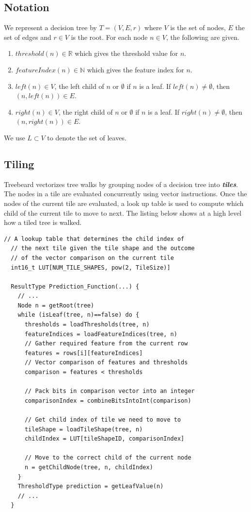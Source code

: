 \subsection{Notation}
We represent a decision tree by $T = (V, E, r)$ where $V$ is the set of nodes, $E$ the set of edges and
$r \in V$ is the root. For each node $n \in V$, the following are given.
\begin{enumerate}
    \item $threshold(n) \in \mathbb{R}$ which gives the threshold value for $n$.
    \item $featureIndex(n) \in \mathbb{N}$ which gives the feature index for $n$.
    \item $left(n) \in V$, the left child of $n$ or $\emptyset$ if $n$ is a leaf. If $left(n) \neq \emptyset$, then $(n, left(n)) \in E$.
    \item $right(n) \in V$, the right child of $n$ or $\emptyset$ if $n$ is a leaf. If $right(n) \neq \emptyset$, then $(n, right(n)) \in E$.
\end{enumerate}
We use $L \subset V$ to denote the set of leaves. 

\subsection{Tiling}
\label{sec:Tiling}
Treebeard vectorizes tree walks by grouping nodes of a decision tree into \textbf{\emph{tiles}}. The nodes in a tile are evaluated concurrently using vector instructions. Once the nodes of the current tile are evaluated, a look up table is used to compute which child of the current tile to move to next. The listing below shows at a high level how a tiled tree is walked. 
\begin{lstlisting}[style=c++]
  // A lookup table that determines the child index of
  // the next tile given the tile shape and the outcome
  // of the vector comparison on the current tile
  int16_t LUT[NUM_TILE_SHAPES, pow(2, TileSize)]
  
  ResultType Prediction_Function(...) {
    // ...
    Node n = getRoot(tree)
    while (isLeaf(tree, n)==false) do {
      thresholds = loadThresholds(tree, n)
      featureIndices = loadFeatureIndices(tree, n)
      // Gather required feature from the current row
      features = rows[i][featureIndices]
      // Vector comparison of features and thresholds
      comparison = features < thresholds
      
      // Pack bits in comparison vector into an integer
      comparisonIndex = combineBitsIntoInt(comparison)
      
      // Get child index of tile we need to move to
      tileShape = loadTileShape(tree, n)
      childIndex = LUT[tileShapeID, comparisonIndex]
      
      // Move to the correct child of the current node
      n = getChildNode(tree, n, childIndex) 
    }
    ThresholdType prediction = getLeafValue(n)
    // ...
  }  
\end{lstlisting}

